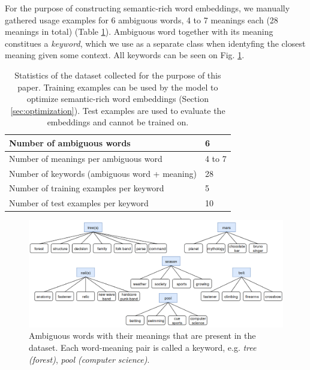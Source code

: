 \documentclass{llncs}
\begin{document}
For the purpose of constructing semantic-rich word embeddings, we manually gathered usage examples for 6 ambiguous words, 4 to 7 meanings each (28 meanings in total) (Table \ref{table:dataset}).
Ambiguous word together with its meaning constitues a \textit{keyword}, which we use as a separate class when identyfing the closest meaning given some context.
All keywords can be seen on Fig. \ref{fig:keywords}.

\begin{table}
\centering
    \begin{tabular}{ | m{7.5cm} | m{1cm} | }
        \hline
        Number of ambiguous words & 6 \\
        \hline
        Number of meanings per ambiguous word & 4 to 7 \\
        \hline
        Number of keywords (ambiguous word + meaning) & 28 \\
    \hline
    \hline
    Number of training examples per keyword & 5 \\
    \hline
    Number of test examples per keyword & 10 \\
    \hline
    \end{tabular}
    \caption{Statistics of the dataset collected for the purpose of this paper. Training examples can be used by the model to optimize semantic-rich word embeddings (Section \ref{sec:optimization}). Test examples are used to evaluate the embeddings and cannot be trained on.}
    \label{table:dataset}
\end{table}

\begin{figure}
    \centering
    \caption{Ambiguous words with their meanings that are present in the dataset. Each word-meaning pair is called a keyword, e.g. \textit{tree (forest)}, \textit{pool (computer science)}.}
    \label{fig:keywords}
    \includegraphics[scale=0.35]{res/keywords.png}
\end{figure}
\end{document}
